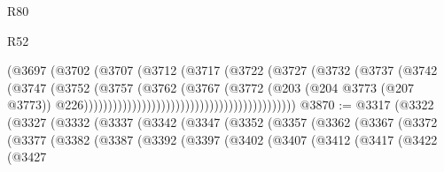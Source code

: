 \begin{lexlean}{R80}
\begin{lexlean}{R52}
\begin{coremodule}
{{{{{{{{{{{{{{{{{{{{{{{{{{{{{{{{{{{{{{{{{{{{{{{{{{{{{{{{{{{{{{{{{{{{{{{{{{{{{{{{{{{{{{{{{{{{{{{{{{{{{{{{{{{{{{{{{{{{{{{{{{{{{{{{{{{{{{{{{{{{{{{{{{{{{{{{{{{{{{{{{{{{{{{{{{{{{{{{{{{{{{{{{{{{{{{{{{{{{{                                                          (@3697
                                                            (@3702
                                                              (@3707
                                                                (@3712
                                                                  (@3717
                                                                    (@3722
                                                                      (@3727
                                                                        (@3732
                                                                          (@3737
                                                                            (@3742
                                                                              (@3747
                                                                                (@3752
                                                                                  (@3757
                                                                                    (@3762
                                                                                      (@3767
                                                                                        (@3772
                                                                                          (@203
                                                                                            (@204
                                                                                              @3773
                                                                                              (@207
                                                                                                @3773))
                                                                                            @226))))))))))))))))))))))))))))))))))))))))))))
@3870 := @3317
    (@3322
      (@3327
        (@3332
          (@3337
            (@3342
              (@3347
                (@3352
                  (@3357
                    (@3362
                      (@3367
                        (@3372
                          (@3377
                            (@3382
                              (@3387
                                (@3392
                                  (@3397
                                    (@3402
                                      (@3407
                                        (@3412
                                          (@3417
                                            (@3422
                                              (@3427
}}}}}}}}}}}}}}}}}}}}}}}}}}}}}}}}}}}}}}}}}}}}}}}}}}}}}}}}}}}}}}}}}}}}}}}}}}}}}}}}}}}}}}}}}}}}}}}}}}}}}}}}}}}}}}}}}}}}}}}}}}}}}}}}}}}}}}}}}}}}}}}}}}}}}}}}}}}}}}}}}}}}}}}}}}}}}}}}}}}}}}}}}}}}}}}}}}}}}}
\end{coremodule}
\end{lexlean}
\end{lexlean}
